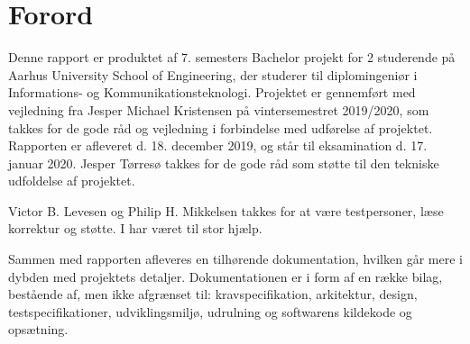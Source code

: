 \chapter{Forord}

Denne rapport er produktet af 7. semesters Bachelor projekt for 2 studerende på Aarhus University School of Engineering, der studerer til diplomingeniør i Informations- og Kommunikationsteknologi. Projektet er gennemført med vejledning fra Jesper Michael Kristensen på vintersemestret 2019/2020, som takkes for de gode råd og vejledning i forbindelse med udførelse af projektet. Rapporten er afleveret d. 18. december 2019, og står til eksamination d. 17. januar 2020. Jesper Tørresø takkes for de gode råd som støtte til den tekniske udfoldelse af projektet.

Victor B. Levesen og Philip H. Mikkelsen takkes for at være testpersoner, læse korrektur og støtte. I har været til stor hjælp.

Sammen med rapporten afleveres en tilhørende dokumentation, hvilken går mere i dybden med projektets detaljer. Dokumentationen er i form af en række bilag, bestående af, men ikke afgrænset til: kravspecifikation, arkitektur, design, testspecifikationer, udviklingsmiljø, udrulning og softwarens kildekode og opsætning.
